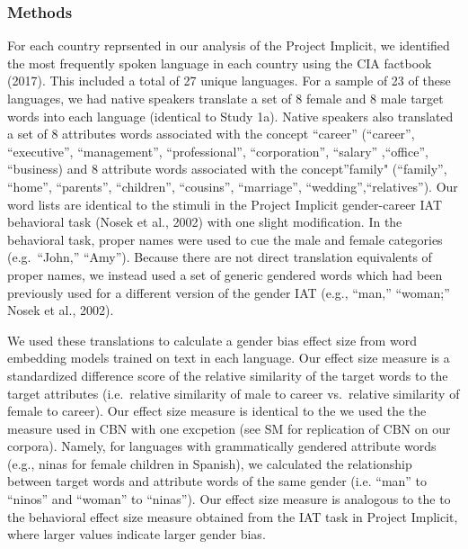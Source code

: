 \documentclass[man,floatsintext]{apa6}
\theoremstyle{definition}
\theoremstyle{definition}
\theoremstyle{definition}
\theoremstyle{remark}
\begin{document}
\subsubsection{Methods}\label{methods-1}

For each country reprsented in our analysis of the Project Implicit, we
identified the most frequently spoken language in each country using the
CIA factbook (2017). This included a total of 27 unique languages. For a
sample of 23 of these languages, we had native speakers translate a set
of 8 female and 8 male target words into each language (identical to
Study 1a). Native speakers also translated a set of 8 attributes words
associated with the concept \enquote{career} (\enquote{career},
\enquote{executive}, \enquote{management}, \enquote{professional},
\enquote{corporation}, \enquote{salary} ,\enquote{office},
\enquote{business) and 8 attribute words associated with the
concept}family" (\enquote{family}, \enquote{home}, \enquote{parents},
\enquote{children}, \enquote{cousins}, \enquote{marriage},
\enquote{wedding},\enquote{relatives}). Our word lists are identical to
the stimuli in the Project Implicit gender-career IAT behavioral task
(Nosek et al., 2002) with one slight modification. In the behavioral
task, proper names were used to cue the male and female categories
(e.g.~\enquote{John,} \enquote{Amy}). Because there are not direct
translation equivalents of proper names, we instead used a set of
generic gendered words which had been previously used for a different
version of the gender IAT (e.g., ``man,'' ``woman;'' Nosek et al.,
2002).

We used these translations to calculate a gender bias effect size from
word embedding models trained on text in each language. Our effect size
measure is a standardized difference score of the relative similarity of
the target words to the target attributes (i.e.~relative similarity of
male to career vs.~relative similarity of female to career). Our effect
size measure is identical to the we used the the measure used in CBN
with one excpetion (see SM for replication of CBN on our corpora).
Namely, for languages with grammatically gendered attribute words (e.g.,
ninas for female children in Spanish), we calculated the relationship
between target words and attribute words of the same gender (i.e.
\enquote{man} to \enquote{ninos} and \enquote{woman} to
\enquote{ninas}). Our effect size measure is analogous to the to the
behavioral effect size measure obtained from the IAT task in Project
Implicit, where larger values indicate larger gender bias.
\end{document}
